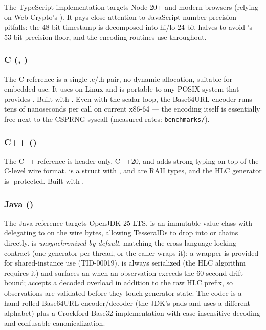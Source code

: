 The TypeScript implementation targets Node 20+ and modern browsers (relying on Web Crypto's ). It pays close attention to JavaScript number-precision pitfalls: the 48-bit timestamp is decomposed into hi/lo 24-bit halves to avoid 's 53-bit precision floor, and the encoding routines use  throughout.

\subsubsection{C (, )}

The C reference is a single .c/.h pair, no dynamic allocation, suitable for embedded use. It uses  on Linux and is portable to any POSIX system that provides . Built with . Even with the scalar loop, the Base64URL encoder runs tens of nanoseconds per call on current x86-64 --- the encoding itself is essentially free next to the CSPRNG syscall (measured rates: \texttt{benchmarks/}).

\subsubsection{C++ ()}

The C++ reference is header-only, C++20, and adds strong typing on top of the C-level wire format.  is a struct with ,  and  are RAII types, and the HLC generator is -protected. Built with .

\subsubsection{Java ()}

The Java reference targets OpenJDK 25 LTS.  is an immutable value class with  delegating to  on the wire bytes, allowing TesseraIDs to drop into  or  chains directly.  is \emph{unsynchronized by default}, matching the cross-language locking contract (one generator per thread, or the caller wraps it); a  wrapper is provided for shared-instance use (TID-00019).  is always serialized (the HLC algorithm requires it) and surfaces an  when an observation exceeds the 60-second drift bound;  accepts a decoded  overload in addition to the raw HLC prefix, so observations are validated before they touch generator state. The codec is a hand-rolled Base64URL encoder/decoder (the JDK's  pads and uses a different alphabet) plus a Crockford Base32 implementation with case-insensitive decoding and confusable canonicalization.

